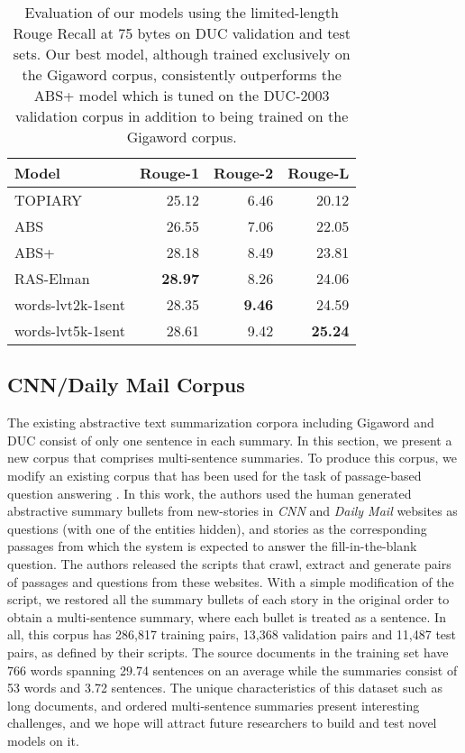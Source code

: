 \documentclass[11pt]{article}
\begin{document}
\begin{table}[h]
\centering
{\small
\begin{tabular}{|l|r|r|r|}
\hline
Model & Rouge-1 & Rouge-2 & Rouge-L \\
\hline
TOPIARY & 25.12 & 6.46 & 20.12 \\
ABS &   26.55 & 7.06 & 22.05 \\
ABS+ &   28.18 & 8.49 & 23.81 \\
RAS-Elman & {\bf 28.97} & 8.26 & 24.06 \\
words-lvt2k-1sent &  28.35 & {\bf 9.46} & 24.59 \\
words-lvt5k-1sent & 28.61 & 9.42 &  {\bf 25.24} \\
\hline
\end{tabular}
}
\caption{{\small Evaluation of our models using the limited-length Rouge Recall  at 75 bytes on DUC validation and test sets. Our best model, although trained exclusively on the Gigaword corpus, consistently outperforms the ABS+ model which is tuned on the DUC-2003 validation corpus in addition to being trained on the Gigaword corpus.}}
\label{tab:duc}
\end{table}



\subsection{CNN/Daily Mail Corpus}
The existing abstractive text summarization corpora including Gigaword and DUC consist of only one sentence in each summary. In this section, we present a new corpus that comprises multi-sentence summaries. To produce this corpus, we modify an existing corpus that has been used for the task of passage-based question answering \cite{reading_comprehension}. In this work, the authors used the human generated abstractive summary bullets from new-stories in {\it CNN} and {\it Daily Mail} websites as questions (with one of the entities hidden), and stories as the corresponding passages from which the system is expected to answer the fill-in-the-blank question. The authors released the scripts that crawl,  extract and generate pairs of passages and questions from these websites. With a simple modification of the script, we restored all the summary bullets of each story in the original order to obtain a multi-sentence summary, where each bullet is treated as a sentence. In all, this corpus has 286,817 training pairs, 13,368 validation pairs and 11,487 test pairs, as defined by their scripts. The source documents in the training set have 766 words spanning 29.74 sentences on an average while the summaries consist of 53 words and 3.72 sentences. The unique characteristics of this dataset such as long documents, and ordered multi-sentence summaries present interesting challenges, and we hope will attract future researchers to build and test novel models on it.
\end{document}
